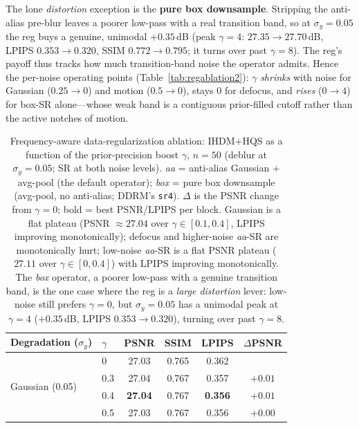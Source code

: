 \documentclass[11pt]{article}
\begin{document}
The lone \emph{distortion} exception is the \textbf{pure box downsample}. Stripping the anti-alias
pre-blur leaves a poorer low-pass with a real transition band, so at $\sigma_y{=}0.05$ the reg buys a
genuine, unimodal $+0.35$\,dB (peak $\gamma{=}4$: $27.35\!\to\!27.70$\,dB, LPIPS $0.353\!\to\!0.320$,
SSIM $0.772\!\to\!0.795$; it turns over past $\gamma{=}8$). The reg's payoff thus tracks how much
transition-band noise the operator admits. Hence the per-noise operating points
(Table~\ref{tab:regablation2}): $\gamma$ \emph{shrinks} with noise for Gaussian ($0.25\!\to\!0$) and
motion ($0.5\!\to\!0$), stays $0$ for defocus, and \emph{rises} ($0\!\to\!4$) for box-SR alone---whose
weak band is a contiguous prior-filled cutoff rather than the active notches of motion.

\begin{table}[h]
\centering
\caption{Frequency-aware data-regularization ablation: IHDM$+$HQS as a function of the
prior-precision boost $\gamma$, $n=50$ (deblur at $\sigma_y{=}0.05$; SR at both noise levels).
\emph{aa} = anti-alias Gaussian $+$ avg-pool (the default operator); \emph{box} = pure box
downsample (avg-pool, no anti-alias; DDRM's \texttt{sr4}).
$\Delta$ is the PSNR change from $\gamma{=}0$; bold = best PSNR/LPIPS per block. Gaussian is a flat
plateau (PSNR $\approx\!27.04$ over $\gamma\in[0.1,0.4]$, LPIPS improving monotonically); defocus
and higher-noise \emph{aa}-SR are monotonically hurt; low-noise \emph{aa}-SR is a flat PSNR plateau
($27.11$ over $\gamma\in[0,0.4]$) with LPIPS improving monotonically. The \emph{box} operator, a
poorer low-pass with a genuine transition band, is the one case where the reg is a \emph{large
distortion} lever: low-noise still prefers $\gamma{=}0$, but $\sigma_y{=}0.05$ has a unimodal peak
at $\gamma{=}4$ ($+0.35$\,dB, LPIPS $0.353\!\to\!0.320$), turning over past $\gamma{=}8$.}
\label{tab:regablation}
\begin{tabular}{llcccc}
\toprule
Degradation ($\sigma_y$) & $\gamma$ & PSNR & SSIM & LPIPS & $\Delta$PSNR \\
\midrule
\multirow{4}{*}{Gaussian (0.05)}   & 0    & 27.03 & 0.765 & 0.362 & \\
                                   & 0.3  & 27.04 & 0.767 & 0.357 & $+0.01$ \\
                                   & 0.4  & \textbf{27.04} & 0.767 & \textbf{0.356} & $+0.01$ \\
                                   & 0.5  & 27.03 & 0.767 & 0.356 & $+0.00$ \\

\end{tabular}
\end{table}
\end{document}

